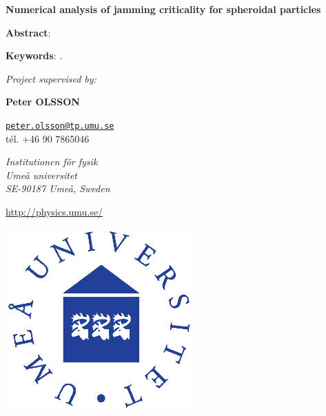 \documentclass[class=report, float=false, crop=false]{standalone}
\begin{document}
\begin{center}



\vspace{1.5cm}

\textbf{\huge Numerical analysis of jamming criticality for spheroidal particles}



\vspace{0.5cm}

\parbox{15cm}{\small
\textbf{Abstract}: \it 
} %


\vspace{0.5cm}

\parbox{15cm}{
\textbf{Keywords}: \it .
} %

\vspace{0.5cm}

\parbox{15cm}{

\begin{center}

{\it \small Project supervised by:}

\vspace{0.4cm}

\begin{minipage}{0.3\textwidth}
\centering

{\bf Peter OLSSON}

\href{mailto:peter.olsson@tp.umu.se}{\tt peter.olsson@tp.umu.se} \\ tél. +46 90 7865046


{\it Institutionen för fysik \\ Umeå universitet \\ SE-90187 Umeå, Sweden}

\url{http://physics.umu.se/}

\end{minipage}

\end{center}
} %

\vspace{0.5cm}

\includegraphics[height=7cm]{Umea_University.eps}

\end{center}

\vfill
\newpage
\end{document}

